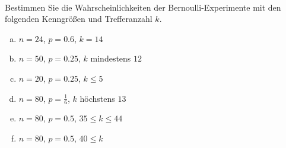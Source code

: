 \begin{aufgabe} ~ \\ 
Bestimmen Sie die Wahrscheinlichkeiten der Bernoulli-Experimente mit den folgenden Kenngrößen und Trefferanzahl $k$.\begin{multicols}{2} 
\begin{enumerate}[a)] 
\item 
$n=24$, $p=0.6$, $k=14$
\item 
$n=50$, $p=0.25$, $k$ mindestens $12$
\item 
$n=20$, $p=0.25$, $k \leq 5$
\item 
$n=80$, $p=\frac{1}{6}$, $k$ höchstens $13$
\item 
$n=80$, $p=0.5$, $35\leq k \leq 44$
\item 
$n=80$, $p=0.5$, $40\leq k $
\end{enumerate} 
\end{multicols} 
\end{aufgabe} 
